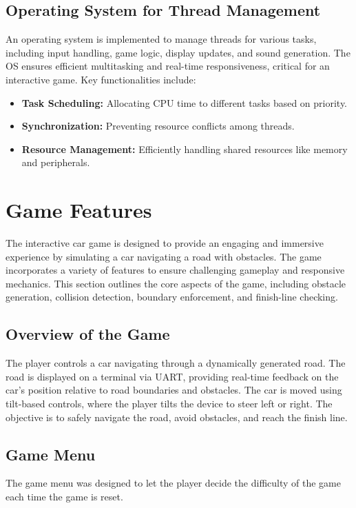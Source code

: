 \documentclass[conference]{IEEEtran}
\begin{document}
\subsection{Operating System for Thread Management}
An operating system is implemented to manage threads for various tasks, including input handling, game logic, display updates, and sound generation. The OS ensures efficient multitasking and real-time responsiveness, critical for an interactive game. Key functionalities include:
\begin{itemize}
    \item \textbf{Task Scheduling:} Allocating CPU time to different tasks based on priority.
    \item \textbf{Synchronization:} Preventing resource conflicts among threads.
    \item \textbf{Resource Management:} Efficiently handling shared resources like memory and peripherals.
\end{itemize}

\section{Game Features}
The interactive car game is designed to provide an engaging and immersive experience by simulating a car navigating a road with obstacles. The game incorporates a variety of features to ensure challenging gameplay and responsive mechanics. This section outlines the core aspects of the game, including obstacle generation, collision detection, boundary enforcement, and finish-line checking.

\subsection{Overview of the Game}
The player controls a car navigating through a dynamically generated road. The road is displayed on a terminal via UART, providing real-time feedback on the car's position relative to road boundaries and obstacles. The car is moved using tilt-based controls, where the player tilts the device to steer left or right. The objective is to safely navigate the road, avoid obstacles, and reach the finish line.
\subsection{Game Menu}
The game menu was designed to let the player decide the difficulty of the game each time the game is reset.
\end{document}
